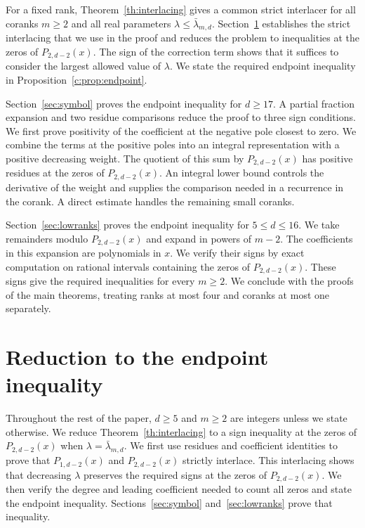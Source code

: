 \documentclass[11pt]{article}
\numberwithin{equation}{section}
\theoremstyle{remark}\newtheorem{remark}[theorem]{Remark}
\begin{document}
For a fixed rank, Theorem~\ref{th:interlacing} gives a common strict
interlacer for all coranks $m\ge2$ and all real parameters
$\lambda\le\bar\lambda_{m,d}$. Section~\ref{sec:comparisons} establishes the
strict interlacing that we use in the proof and reduces the problem to
inequalities at the zeros of $P_{2,d-2}(x)$. The sign of the correction
term shows that it suffices to consider the largest allowed value of $\lambda$.
We state the required endpoint inequality in
Proposition~\ref{c:prop:endpoint}.

Section~\ref{sec:symbol} proves the endpoint inequality for $d\ge17$.
A partial fraction expansion and two residue comparisons reduce the
proof to three sign conditions. We first prove positivity of the
coefficient at the negative pole closest to zero. We combine the terms
at the positive poles into an integral representation with
a positive decreasing weight. The quotient of this sum by $P_{2,d-2}(x)$ has
positive residues at the zeros of $P_{2,d-2}(x)$. An integral lower bound
controls the derivative of the weight and supplies the comparison
needed in a recurrence in the corank. A direct estimate handles the
remaining small coranks.

Section~\ref{sec:lowranks} proves the endpoint inequality for
$5\le d\le16$. We take remainders modulo $P_{2,d-2}(x)$ and expand in powers
of $m-2$. The coefficients in this expansion are polynomials in $x$. We verify
their signs by exact computation on rational intervals containing the
zeros of $P_{2,d-2}(x)$. These signs give the required inequalities for every $m\ge2$.
We conclude with the proofs of the main theorems, treating ranks at most four
and coranks at most one separately.

\section{Reduction to the endpoint inequality}\label{sec:comparisons}

Throughout the rest of the paper, $d\ge5$ and $m\ge2$ are integers
unless we state otherwise. We reduce Theorem~\ref{th:interlacing} to a sign
inequality at the zeros of $P_{2,d-2}(x)$ when $\lambda=\bar\lambda_{m,d}$.
We first use residues and coefficient identities to prove that
$P_{1,d-2}(x)$ and $P_{2,d-2}(x)$ strictly interlace.
This interlacing shows that decreasing $\lambda$ preserves the required
signs at the zeros of $P_{2,d-2}(x)$. We then verify the degree and
leading coefficient needed to count all zeros and state the endpoint inequality.
Sections~\ref{sec:symbol} and~\ref{sec:lowranks} prove that inequality.
\end{document}
